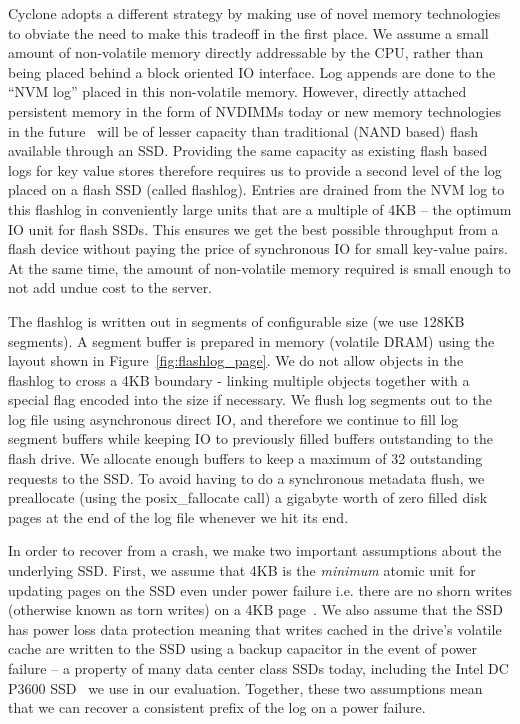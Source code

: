\documentclass[twocolumn]{article}
\begin{document}
Cyclone adopts a different strategy by making use of novel memory technologies
to obviate the need to make this tradeoff in the first place. We assume a small
amount of non-volatile memory directly addressable by the CPU, rather than being
placed behind a block oriented IO interface. Log appends are done to the ``NVM
log'' placed in this non-volatile memory. However, directly attached persistent 
memory in the form of NVDIMMs today or new memory technologies in the
future~\cite{pmfs} will be of lesser capacity than traditional (NAND based)
flash available through an
SSD. Providing the same capacity as existing flash based logs for key value
stores therefore requires us to provide a second level of the log
placed on a flash SSD (called flashlog).  Entries are drained from
the NVM log to this flashlog in conveniently large units that are a multiple of
4KB -- the optimum IO unit for flash SSDs. This ensures we get the best possible
throughput from a flash device without paying the price of synchronous IO for
small key-value pairs. At the same time, the amount of non-volatile memory
required is small enough to not add undue cost to the server.

The flashlog is written out in segments of configurable size (we use 128KB
segments). A segment buffer is prepared in memory (volatile DRAM) using the
layout shown in Figure~\ref{fig:flashlog_page}. We do not allow objects in the
flashlog to cross a 4KB boundary - linking multiple objects together with a
special flag encoded into the size if necessary. We flush log segments out to
the log file using asynchronous direct IO, and therefore we continue to fill log
segment buffers while keeping IO to previously filled buffers outstanding to the
flash drive. We allocate enough buffers to keep a maximum of 32 outstanding
requests to the SSD. To avoid having to do a synchronous metadata flush, we
preallocate (using the posix\_fallocate call) a gigabyte worth of zero filled
disk pages at the end of the log file whenever we hit its end.

In order to recover from a crash, we make two important assumptions about the
underlying SSD. First, we assume that 4KB is the \emph{minimum} atomic unit for
updating pages on the SSD even under power failure i.e. there are no shorn
writes (otherwise known as torn writes) on a 4KB page~\cite{shorn_writes}. We
also assume that the SSD has power loss data protection meaning that writes
cached in the drive's volatile cache are written to the SSD using a backup
capacitor in the event of power failure -- a property of many data center class
SSDs today, including the Intel DC P3600 SSD~\cite{ssd_spec} we use in our
evaluation. Together, these two assumptions mean that we can recover a
consistent prefix of the log on a power failure.
\end{document}
